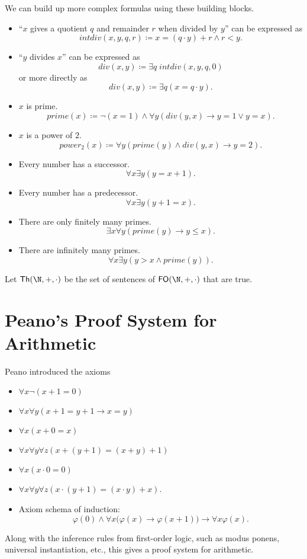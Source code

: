 \noindent We can build up more complex formulas using these building blocks.
\begin{itemize}
    \item ``$x$ gives a quotient $q$ and remainder $r$ when divided by $y$''
    can be expressed as \[
        \mathit{intdiv}(x, y, q, r)
            \coloneq x = (q \cdot y) + r \land r < y.
    \]
    \item ``$y$ divides $x$'' can be expressed as \[
        \mathit{div}(x, y)
            \coloneq \exists q\; \mathit{intdiv}(x, y, q, 0)
    \] or more directly as \[
        \mathit{div}(x, y)
            \coloneq \exists q (x = q \cdot y).
    \]
    \item $x$ is prime. \[
        \mathit{prime}(x)
            \coloneq \neg (x = 1) \land
            \forall y (\mathit{div}(y, x) \rightarrow y = 1 \lor y = x).
    \]
    \item $x$ is a power of $2$. \[
        \mathit{power_2}(x)
            \coloneq \forall y (\mathit{prime}(y) \land \mathit{div}(y, x) \rightarrow y = 2).
    \]
    \item Every number has a successor. \[
        \forall x \exists y (y = x + 1).
    \]
    \item Every number has a predecessor. \[
        \forall x \exists y (y + 1 = x).
    \]
    \item There are only finitely many primes. \[
        \exists x \forall y (\mathit{prime}(y) \rightarrow y \leq x).
    \]
    \item There are infinitely many primes. \[
        \forall x \exists y (y > x \land \mathit{prime}(y)).
    \]
\end{itemize}

\noindent Let $\Th(\N, +, \cdot)$ be the set of sentences of
$\FO(\N, +, \cdot)$ that are true.
\section{Peano's Proof System for Arithmetic} \label{sec:peano}
Peano introduced the axioms
\begin{itemize}
    \item $\forall x \neg (x + 1 = 0)$
    \item $\forall x \forall y (x + 1 = y + 1 \rightarrow x = y)$
    \item $\forall x (x + 0 = x)$
    \item $\forall x \forall y \forall z (x + (y + 1) = (x + y) + 1)$
    \item $\forall x (x \cdot 0 = 0)$
    \item $\forall x \forall y \forall z (x \cdot (y + 1) = (x \cdot y) + x)$.
    \item Axiom schema of induction:
    \[
        \varphi(0) \land
        \forall x \big(\varphi(x) \rightarrow \varphi(x + 1)\big)
            \rightarrow \forall x \varphi(x).
    \]
\end{itemize}
Along with the inference rules from first-order logic, such as modus ponens,
universal instantiation, etc.,
this gives a proof system for arithmetic.

